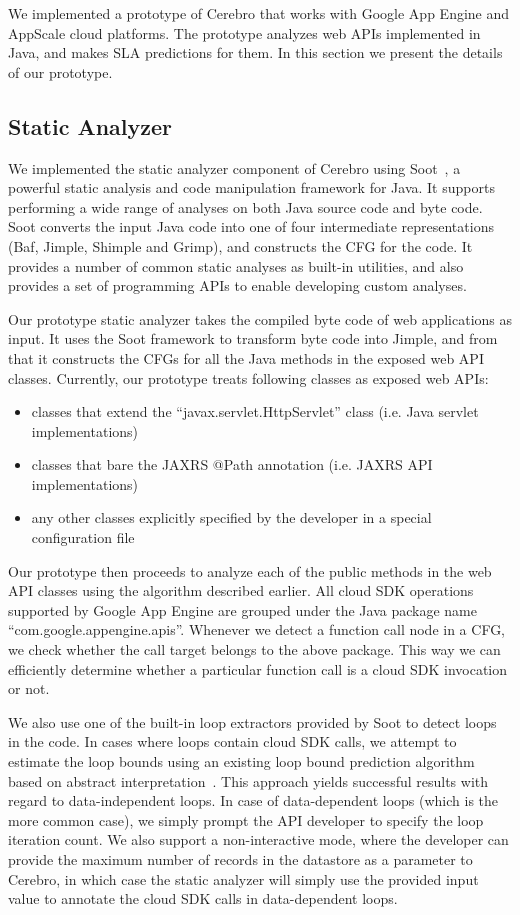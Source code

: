 We implemented a prototype of Cerebro that works with Google App Engine and AppScale cloud platforms.
The prototype analyzes web APIs implemented in Java, and makes SLA predictions for them.  In this
section we present the details of our prototype.

\subsection{Static Analyzer}
We implemented the static analyzer component of Cerebro using Soot~\cite{Vallee-Rai:2010:SJB:1925805.1925818}, a powerful
static analysis and code manipulation framework for Java. It supports performing a wide range of analyses on both Java source
code and byte code. Soot converts the input Java code into one of four intermediate representations (Baf, Jimple,
 Shimple and Grimp), and constructs the CFG for the code. It provides a number of common static
 analyses as built-in utilities, and also provides a set of programming APIs to enable developing custom
 analyses.
 
Our prototype static analyzer takes the compiled byte code of web applications as input. It uses the
Soot framework to transform byte code into Jimple, and from that it constructs the CFGs for 
all the Java methods in the exposed web API classes. Currently, our
prototype treats following classes as exposed web APIs:

\begin{itemize}
\item classes that extend the ``javax.servlet.HttpServlet'' class (i.e. Java servlet implementations)
\item classes that bare the JAXRS @Path annotation (i.e. JAXRS API implementations)
\item any other classes explicitly specified by the developer in a special configuration file
\end{itemize}
 
Our prototype then proceeds to analyze each of the public methods in the web API classes
using the algorithm described earlier. All cloud SDK operations supported by Google App Engine
are grouped under the Java package name ``com.google.appengine.apis''. Whenever we detect
a function call node in a CFG, we check whether the call target belongs to the above package.
This way we can efficiently determine whether a particular function call is a cloud SDK invocation or
not.

We also use one of the built-in loop extractors provided by
Soot to detect loops in the code. In cases where loops contain cloud SDK calls, we attempt to estimate
the loop bounds using an existing loop bound prediction algorithm based on abstract interpretation~\cite{bygde2010static}. This
approach yields successful results with regard to data-independent loops. In case of data-dependent
loops (which is the more common case), we simply prompt the API developer to specify the loop iteration
count. We also support a non-interactive mode, where the developer can provide the maximum number of
records in the datastore as a parameter to Cerebro, in which case the static analyzer will simply use the
provided input value to annotate the cloud SDK calls in data-dependent loops.

